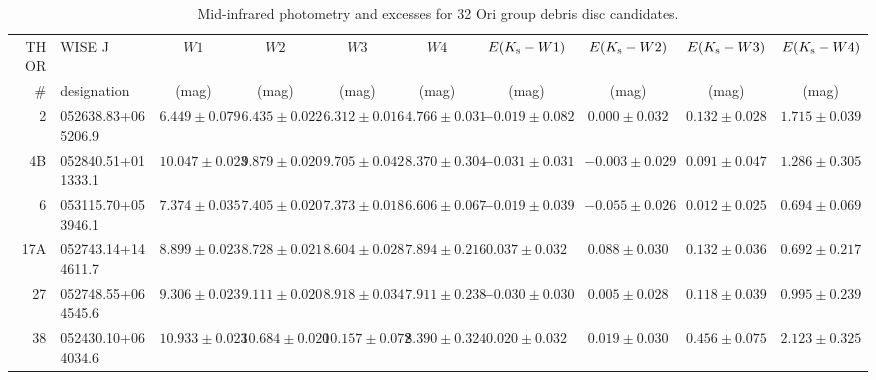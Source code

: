 \documentclass[usenatbib]{mnras}
\begin{document}
\begin{landscape}
\begin{table}
\caption[]{Mid-infrared photometry and excesses for 32 Ori group debris disc candidates. \label{tab:excesses}}
\begin{tabular}{r l c c c c c c c c}
\hline
THOR   &    WISE J                          &   $W1$                       &   $W2$                    &   $W3$                      &   $W4$                     &   $E(K_{\rm{s}}-W1)$   &   $E(K_{\rm{s}}-W2)$   &   $E(K_{\rm{s}}-W3)$   &   $E(K_{\rm{s}}-W4)$\\ 
\#            &   designation                     &   (mag)                       &   (mag)                    &   (mag)                      &   (mag)                     &   (mag)                         &   (mag)                          &   (mag)                         &              (mag)\\
\hline
2 &   052638.83+065206.9     &   $6.449\pm0.079$    &   $6.435\pm0.022$  &   $6.312\pm0.016$   &   $4.766\pm0.031$   &   $-0.019\pm0.082$   &   $0.000\pm0.032$   &   $0.132\pm0.028$   &   $1.715\pm0.039$\\
4B    &   052840.51+011333.1   &   $10.047\pm0.023$   &   $9.879\pm0.020$   &   $9.705\pm0.042$   &   $8.370\pm0.304$   &   $-0.031\pm0.031$   &   $-0.003\pm0.029$   &   $0.091\pm0.047$   &   $1.286\pm0.305$\\
6          &   053115.70+053946.1      &   $7.374\pm0.035$   &   $7.405\pm0.020$   &   $7.373\pm0.018$   &   $6.606\pm0.067$   &   $-0.019\pm0.039$   &   $-0.055\pm0.026$   &   $0.012\pm0.025$   &   $0.694\pm0.069$\\
17A    &   052743.14+144611.7   &   $8.899\pm0.023$   &   $8.728\pm0.021$   &   $8.604\pm0.028$   &   $7.894\pm0.216$   &   $0.037\pm0.032$   &   $0.088\pm0.030$   &   $0.132\pm0.036$   &   $0.692\pm0.217$\\
27    &   052748.55+064545.6   &   $9.306\pm0.023$   &   $9.111\pm0.020$   &   $8.918\pm0.034$   &   $7.911\pm0.238$   &   $-0.030\pm0.030$   &   $0.005\pm0.028$   &   $0.118\pm0.039$   &   $0.995\pm0.239$\\
38    &   052430.10+064034.6   &   $10.933\pm0.023$   &   $10.684\pm0.020$   &   $10.157\pm0.072$   &   $8.390\pm0.324$   &   $0.020\pm0.032$   &   $0.019\pm0.030$   &   $0.456\pm0.075$   &   $2.123\pm0.325$\\
\hline
\end{tabular}
\end{table}
\end{landscape}
\end{document}
